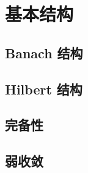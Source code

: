 \section{基本结构}
\label{b1:sec:2102}


\subsection{Banach 结构}
\label{b1:subsec:210201}

\subsection{Hilbert 结构}
\label{b1:subsec:210202}

\subsection{完备性}
\label{b1:subsec:210203}

\subsection{弱收敛}
\label{b1:subsec:210204}



